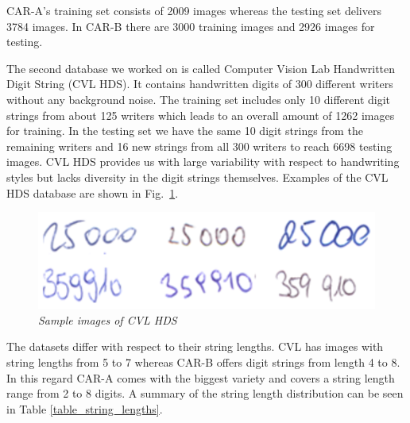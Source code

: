 CAR-A's training set consists of 2009 images whereas the testing set delivers 3784 images. In CAR-B there are 3000 training images and 2926 images for testing.

The second database we worked on is called Computer Vision Lab Handwritten Digit String (CVL HDS). It contains handwritten digits of 300 different writers without any background noise. The training set includes only 10 different digit strings from about 125 writers which leads to an overall amount of 1262 images for training. In the testing set we have the same 10 digit strings from the remaining writers and 16 new strings from all 300 writers to reach 6698 testing images. CVL HDS provides us with large variability with respect to handwriting styles but lacks diversity in the digit strings themselves. Examples of the CVL HDS database are shown in Fig.~\ref{fig:cvl}.

\begin{figure}
  \includegraphics[width=\linewidth]{images/CVL-HDS-Splitted.png}
  \caption{\it Sample images of CVL HDS}
  \label{fig:cvl}
\end{figure}

The datasets differ with respect to their string lengths. CVL has images with string lengths from 5 to 7 whereas CAR-B offers digit strings from length 4 to 8. In this regard CAR-A comes with the biggest variety and covers a string length range from 2 to 8 digits. A summary of the string length distribution can be seen in Table \ref{table_string_lengths}.

